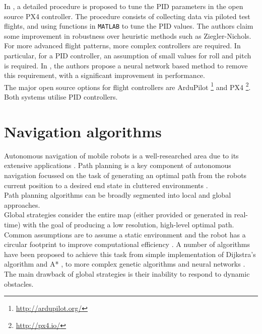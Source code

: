 \documentclass[capstone_report.tex]{subfiles}
\begin{document}
In \cite{saengphet}, a detailed procedure is proposed to tune the PID parameters in the open source PX4 controller. The procedure consists of collecting data via piloted test flights, and using functions in \texttt{MATLAB} to tune the PID values. The authors claim some improvement in robustness over heuristic methods such as Ziegler-Nichols.\\

For more advanced flight patterns, more complex controllers are required. In particular, for a PID controller, an assumption of small values for roll and pitch is required. In \cite{wang}, the authors propose a neural network based method to remove this requirement, with a significant improvement in performance.\\

The major open source options for flight controllers are ArduPilot \footnote{\url{http://ardupilot.org/}} and PX4 \footnote{\url{http://px4.io/}}. Both systems utilise PID controllers.\\


\section{Navigation algorithms}
Autonomous navigation of mobile robots is a well-researched area due to its extensive applications \cite{mac2016heuristic}.  Path planning is a key component of autonomous navigation focussed on the task of generating an optimal path from the robots current position to a desired end state in cluttered environments \cite{raja2011path}.\\

Path planning algorithms can be broadly segmented into local and global approaches.  \\

Global strategies consider the entire map (either provided or generated in real-time) with the goal of producing a low resolution, high-level optimal path.  Common assumptions are to assume a static environment and the robot has a circular footprint to improve computational efficiency \cite{raja2011path}.  A number of algorithms have been proposed to achieve this task from simple implementation of Dijkstra’s algorithm and A* \cite{chen2017exploration}, \cite{marder2010office} to more complex genetic algorithms and neural networks \cite{shiller2000online}.  The main drawback of global strategies is their inability to respond to dynamic obstacles. \\
\end{document}
